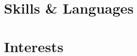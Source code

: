 \documentclass[10pt]{article}
\begin{document}
\cockpit
\befungepy
\termdo
\matsciseg
\ratiocontour
\digitalcollation

\begin{minipage}{\linewidth}
  \section{Skills \& Languages}
  \begin{multicols}{4}
    \raggedcolumns
    \begin{itemize}
      \renewcommand{\labelitemi}{}
      \renewcommand{\skill}{\textnormal}
      \setlength{\itemsep}{1pt}
      \setlength{\parskip}{0pt}
      \setlength{\parsep}{0pt}
      \skillsListLong
    \end{itemize}
  \end{multicols}
  \skillsLegend
\end{minipage}
\vspace{-1em}

\section{Interests}
\interests

\footerCV
\end{document}
